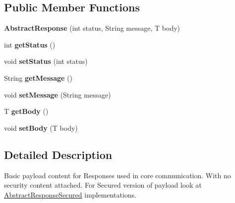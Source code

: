 \subsection*{Public Member Functions}
\begin{DoxyCompactItemize}
\item 
\mbox{\label{classeu_1_1h2020_1_1symbiote_1_1core_1_1cci_1_1AbstractResponse_a9cd60631c7960b63e21384b39bbdf314}} 
{\bfseries Abstract\+Response} (int status, String message, T body)
\item 
\mbox{\label{classeu_1_1h2020_1_1symbiote_1_1core_1_1cci_1_1AbstractResponse_a00d2640494a226fdd31dd6e88db5dafd}} 
int {\bfseries get\+Status} ()
\item 
\mbox{\label{classeu_1_1h2020_1_1symbiote_1_1core_1_1cci_1_1AbstractResponse_a039188b3cbedbff30217ec24638b5a90}} 
void {\bfseries set\+Status} (int status)
\item 
\mbox{\label{classeu_1_1h2020_1_1symbiote_1_1core_1_1cci_1_1AbstractResponse_aac809b61486c66dc89838ede31ba845c}} 
String {\bfseries get\+Message} ()
\item 
\mbox{\label{classeu_1_1h2020_1_1symbiote_1_1core_1_1cci_1_1AbstractResponse_ab1e1ab150ac9bad8c995e68f92b0fb72}} 
void {\bfseries set\+Message} (String message)
\item 
\mbox{\label{classeu_1_1h2020_1_1symbiote_1_1core_1_1cci_1_1AbstractResponse_acf62bd7c1505936712ba2c2fcb08b56c}} 
T {\bfseries get\+Body} ()
\item 
\mbox{\label{classeu_1_1h2020_1_1symbiote_1_1core_1_1cci_1_1AbstractResponse_aa758a2f0e362e1e3e194d27e4994f58b}} 
void {\bfseries set\+Body} (T body)
\end{DoxyCompactItemize}


\subsection{Detailed Description}
Basic payload content for Responses used in core communication. With no security content attached. For Secured version of payload look at \hyperlink{classeu_1_1h2020_1_1symbiote_1_1core_1_1cci_1_1AbstractResponseSecured}{Abstract\+Response\+Secured} implementations.


